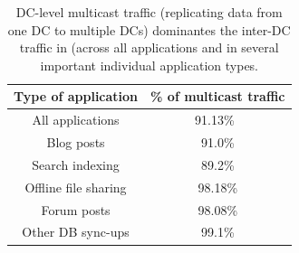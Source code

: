 \begin{table}[t]
\begin{center}
\begin{tabular}{| c | c|}
\hline
 \rowcolor[gray]{0.9}
\textbf{Type of application} & \textbf{\% of multicast traffic} \\
\hline
All applications & 91.13\%~\footnotemark[2]\\
\hline
Blog posts & 91.0\% \\%
\hline
Search indexing & 89.2\%\\%
\hline
Offline file sharing & 98.18\%\\%
\hline
Forum posts & 98.08\%\\%
\hline
Other DB sync-ups & 99.1\%\\%
\hline
\end{tabular}
\end{center}
\caption{DC-level multicast traffic (replicating data from
one DC to multiple DCs) dominantes the inter-DC traffic
in \company (across all applications and in
several important individual application types.}
\label{table:rate}
\end{table}


